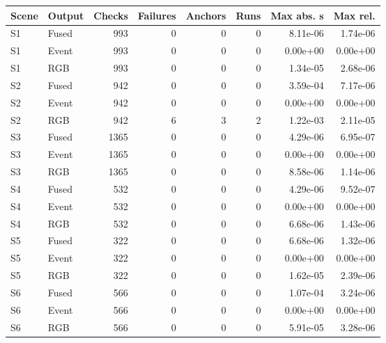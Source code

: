 \begin{tabular}{llrrrrrr}
\toprule
Scene & Output & Checks & Failures & Anchors & Runs & Max abs. s & Max rel. \\
\midrule
S1 & Fused & 993 & 0 & 0 & 0 & 8.11e-06 & 1.74e-06 \\
S1 & Event & 993 & 0 & 0 & 0 & 0.00e+00 & 0.00e+00 \\
S1 & RGB & 993 & 0 & 0 & 0 & 1.34e-05 & 2.68e-06 \\
S2 & Fused & 942 & 0 & 0 & 0 & 3.59e-04 & 7.17e-06 \\
S2 & Event & 942 & 0 & 0 & 0 & 0.00e+00 & 0.00e+00 \\
S2 & RGB & 942 & 6 & 3 & 2 & 1.22e-03 & 2.11e-05 \\
S3 & Fused & 1365 & 0 & 0 & 0 & 4.29e-06 & 6.95e-07 \\
S3 & Event & 1365 & 0 & 0 & 0 & 0.00e+00 & 0.00e+00 \\
S3 & RGB & 1365 & 0 & 0 & 0 & 8.58e-06 & 1.14e-06 \\
S4 & Fused & 532 & 0 & 0 & 0 & 4.29e-06 & 9.52e-07 \\
S4 & Event & 532 & 0 & 0 & 0 & 0.00e+00 & 0.00e+00 \\
S4 & RGB & 532 & 0 & 0 & 0 & 6.68e-06 & 1.43e-06 \\
S5 & Fused & 322 & 0 & 0 & 0 & 6.68e-06 & 1.32e-06 \\
S5 & Event & 322 & 0 & 0 & 0 & 0.00e+00 & 0.00e+00 \\
S5 & RGB & 322 & 0 & 0 & 0 & 1.62e-05 & 2.39e-06 \\
S6 & Fused & 566 & 0 & 0 & 0 & 1.07e-04 & 3.24e-06 \\
S6 & Event & 566 & 0 & 0 & 0 & 0.00e+00 & 0.00e+00 \\
S6 & RGB & 566 & 0 & 0 & 0 & 5.91e-05 & 3.28e-06 \\
\bottomrule
\end{tabular}
